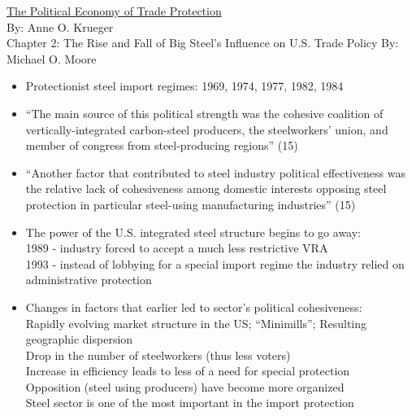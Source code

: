\documentclass[10pt]{article}
\begin{document}
\normalsize\underline{The Political Economy of Trade Protection}\\
\normalsize By: Anne O. Krueger\\
Chapter 2: The Rise and Fall of Big Steel’s Influence on U.S. Trade Policy
By: Michael O. Moore 
\begin{itemize}
  \item Protectionist steel import regimes: 1969, 1974, 1977, 1982, 1984\\
  \item “The main source of this political strength was the cohesive coalition of vertically-integrated carbon-steel producers, the steelworkers’ union, and member of congress from steel-producing regions” (15)\\
  \item “Another factor that contributed to steel industry political effectiveness was the relative lack of cohesiveness among domestic interests opposing steel protection in particular steel-using manufacturing industries” (15)\\
  \item The power of the U.S. integrated steel structure begins to go away:\\ 
        1989 - industry forced to accept a much less restrictive VRA\\
        1993 - instead of lobbying for a special import regime the industry relied on administrative protection\\
  \item Changes in factors that earlier led to sector’s political cohesiveness:\\
        Rapidly evolving market structure in the US; “Minimills”; Resulting geographic dispersion\\
        Drop in the number of steelworkers (thus less voters)\\
        Increase in efficiency leads to less of a need for special protection\\
        Opposition (steel using producers) have become more organized\\
Steel sector is one of the most important in the import protection\\


\end{itemize}
\end{document}
